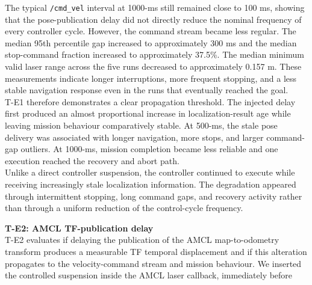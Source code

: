 The typical \texttt{/cmd\_vel} interval at 1000-ms still remained close to 100 ms, showing that the pose-publication delay did not directly reduce the nominal frequency of every controller cycle. However, the command stream became less regular. The median 95th percentile gap increased to approximately 300 ms and the median stop-command fraction increased to approximately 37.5\%. The median minimum valid laser range across the five runs decreased to approximately 0.157 m. These measurements indicate longer interruptions, more frequent stopping, and a less stable navigation response even in the runs that eventually reached the goal.
\\
T-E1 therefore demonstrates a clear propagation threshold. The injected delay first produced an almost proportional increase in localization-result age while leaving mission behaviour comparatively stable. At 500-ms, the stale pose delivery was associated with longer navigation, more stops, and larger command-gap outliers. At 1000-ms, mission completion became less reliable and one execution reached the recovery and abort path. 
\\
Unlike a direct controller suspension, the controller continued to execute while receiving increasingly stale localization information. The degradation appeared through intermittent stopping, long command gaps, and recovery activity rather than through a uniform reduction of the control-cycle frequency.

\noindent \textbf{T-E2: AMCL TF-publication delay}
\\
T-E2 evaluates if delaying the publication of the AMCL map-to-odometry transform produces a measurable TF temporal displacement and if this alteration propagates to the velocity-command stream and mission behaviour. We inserted the controlled suspension inside the AMCL laser callback, immediately before 

